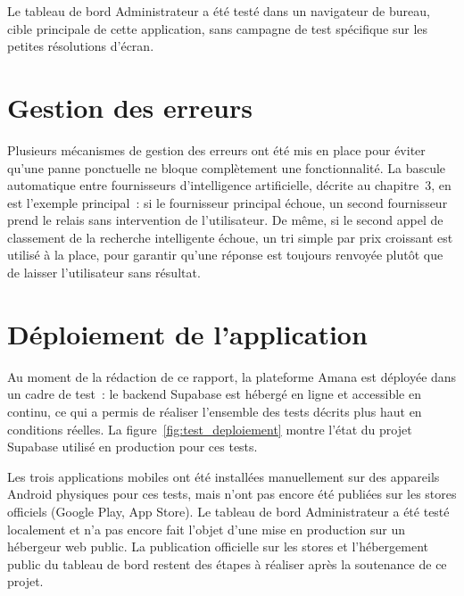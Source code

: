 \documentclass[12pt,fleqn,a4paper]{report}
\begin{document}
\begin{justify}
Le tableau de bord Administrateur a été testé dans un navigateur de bureau, cible principale de cette application, sans campagne de test spécifique sur les petites résolutions d'écran.

\section{Gestion des erreurs}

Plusieurs mécanismes de gestion des erreurs ont été mis en place pour éviter qu'une panne ponctuelle ne bloque complètement une fonctionnalité. La bascule automatique entre fournisseurs d'intelligence artificielle, décrite au chapitre~3, en est l'exemple principal~: si le fournisseur principal échoue, un second fournisseur prend le relais sans intervention de l'utilisateur. De même, si le second appel de classement de la recherche intelligente échoue, un tri simple par prix croissant est utilisé à la place, pour garantir qu'une réponse est toujours renvoyée plutôt que de laisser l'utilisateur sans résultat.

\section{Déploiement de l'application}

Au moment de la rédaction de ce rapport, la plateforme Amana est déployée dans un cadre de test~: le backend Supabase est hébergé en ligne et accessible en continu, ce qui a permis de réaliser l'ensemble des tests décrits plus haut en conditions réelles. La figure~\ref{fig:test_deploiement} montre l'état du projet Supabase utilisé en production pour ces tests.


Les trois applications mobiles ont été installées manuellement sur des appareils Android physiques pour ces tests, mais n'ont pas encore été publiées sur les stores officiels (Google Play, App Store). Le tableau de bord Administrateur a été testé localement et n'a pas encore fait l'objet d'une mise en production sur un hébergeur web public. La publication officielle sur les stores et l'hébergement public du tableau de bord restent des étapes à réaliser après la soutenance de ce projet.


\end{justify}
\end{document}
